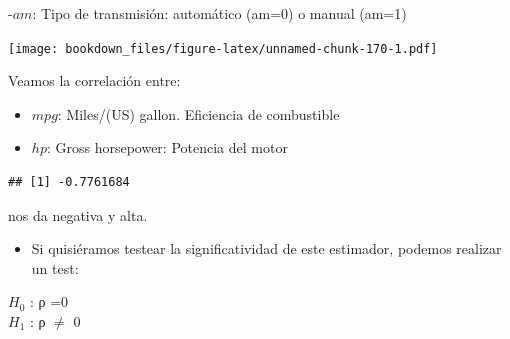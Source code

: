 \documentclass[]{book}
\newenvironment{Shaded}{\begin{snugshade}}{\end{snugshade}}
\newcommand{\DataTypeTok}[1]{\textcolor[rgb]{0.13,0.29,0.53}{#1}}
\newcommand{\KeywordTok}[1]{\textcolor[rgb]{0.13,0.29,0.53}{\textbf{#1}}}
\newcommand{\NormalTok}[1]{#1}
\newcommand{\OperatorTok}[1]{\textcolor[rgb]{0.81,0.36,0.00}{\textbf{#1}}}
\newcommand{\StringTok}[1]{\textcolor[rgb]{0.31,0.60,0.02}{#1}}
\providecommand{\tightlist}{%
  \setlength{\itemsep}{0pt}\setlength{\parskip}{0pt}}
\begin{document}
-\(am\): Tipo de transmisión: automático (am=0) o manual (am=1)

\begin{Shaded}
\end{Shaded}

\texttt{[image: bookdown\_files/figure-latex/unnamed-chunk-170-1.pdf]}

Veamos la correlación entre:

\begin{itemize}
\tightlist
\item
  \(mpg\): Miles/(US) gallon. Eficiencia de combustible
\item
  \(hp\): Gross horsepower: Potencia del motor
\end{itemize}

\begin{Shaded}
\end{Shaded}

\begin{verbatim}
## [1] -0.7761684
\end{verbatim}

nos da negativa y alta.

\begin{itemize}
\tightlist
\item
  Si quisiéramos testear la significatividad de este estimador, podemos realizar un test:
\end{itemize}

\(H_0\) : ρ =0\\
\(H_1\) : ρ \(\neq\) 0

\begin{Shaded}
\end{Shaded}
\end{document}
